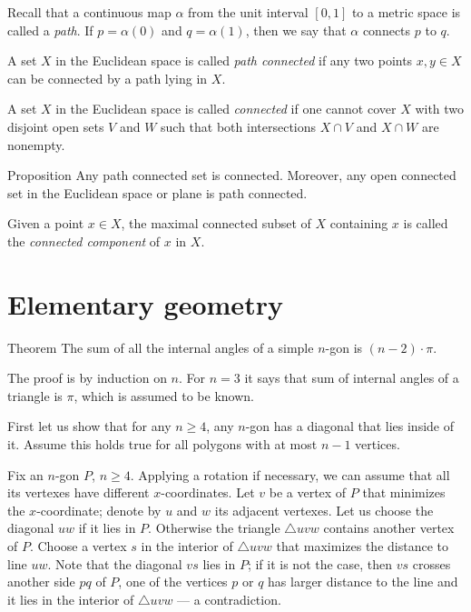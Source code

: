 Recall that a continuous map $\alpha$ from the unit interval $[0,1]$ to a metric space is called a \emph{path}. If $p=\alpha (0)$ and $q = \alpha (1)$, then we say that $\alpha$ connects $p$ to $q$.


A set $X$ in the Euclidean space is called \emph{path connected} if any two points $x,y\in X$ can be connected by a path lying in $X$.

A set $X$ in the Euclidean space is called \emph{connected} if one cannot cover $X$ with two disjoint open sets $V$ and $W$ such that both intersections $X\cap V$ and $X\cap W$ are nonempty.

\begin{thm}{Proposition}
Any path connected set is connected.
Moreover, any open connected set in the Euclidean space or  plane is path connected.
\end{thm}

Given a point $x\in X$, the maximal connected subset of $X$ containing $x$ is called the \emph{connected component} of $x$ in $X$.



\chapter{Elementary geometry}

\begin{thm}{Theorem}\label{thm:sum=(n-2)pi}
The sum of all the internal angles of a simple $n$-gon is $(n-2)\cdot\pi$. 
\end{thm}


The proof is by induction on $n$.
For $n=3$ it says that sum of internal angles of a triangle is $\pi$, which is assumed to be known.

First let us show that for any $n\ge4$, any $n$-gon has a diagonal that lies inside of it.
Assume this holds true for all polygons with at most $n-1$ vertices.

Fix an $n$-gon $P$, $n\ge4$.
Applying a rotation if necessary, we can assume that all its vertexes have different $x$-coordinates.
Let $v$ be a vertex of $P$ that minimizes the $x$-coordinate;
denote by $u$ and $w$ its adjacent vertexes.
Let us choose the diagonal $uw$ if it lies in $P$.
Otherwise the triangle $\triangle uvw$ contains another vertex of $P$.
Choose a vertex $s$ in the interior of $\triangle uvw$ that maximizes the distance to line $uw$.
Note that the diagonal $vs$ lies in $P$;
if it is not the case, then $vs$ crosses another side $pq$ of $P$, one of the vertices $p$ or $q$ has larger distance to the line and it lies in the interior of $\triangle uvw$ --- a contradiction.

